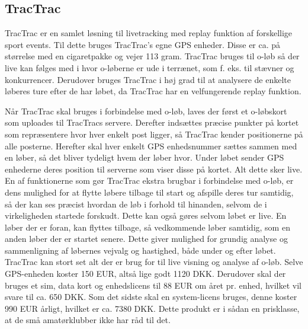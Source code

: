 \subsection{TracTrac}
TracTrac er en samlet løsning til livetracking med replay funktion af forskellige sport events. Til dette bruges TracTrac's egne GPS enheder. Disse er ca. på størrelse med en cigaretpakke og vejer 113 gram.\newline
TracTrac bruges til o-løb så der live kan følges med i hvor o-løberne er ude i terrænet, som f. eks. til stævner og konkurrencer. Derudover bruges TracTrac i høj grad til at analysere de enkelte løberes ture efter de har løbet, da TracTrac har en velfungerende replay funktion. 

Når TracTrac skal bruges i forbindelse med o-løb, laves der først et o-løbskort som uploades til TracTracs servere. Derefter indsættes præcise punkter på kortet som repræsentere hvor hver enkelt post ligger, så TracTrac kender positionerne på alle posterne. Herefter skal hver enkelt GPS enhedsnummer sættes sammen med en løber, så det bliver tydeligt hvem der løber hvor. Under løbet sender GPS enhederne deres position til serverne som viser disse på kortet. Alt dette sker live. En af funktionerne som gør TracTrac ekstra brugbar i forbindelse med o-løb, er dens mulighed for at flytte løbere tilbage til start og afspille deres tur samtidig, så der kan ses præcist hvordan de løb i forhold til hinanden, selvom de i virkeligheden startede forskudt. Dette kan også gøres selvom løbet er live. En løber der er foran, kan flyttes tilbage, så vedkommende løber samtidig, som en anden løber der er startet senere. Dette giver mulighed for grundig analyse og sammenligning af løbernes vejvalg og hastighed, både under og efter løbet.\newline
TracTrac kan stort set alt der er brug for til live visning og analyse af o-løb. Selve GPS-enheden koster 150 EUR, altså lige godt 1120 DKK. Derudover skal der bruges et sim, data kort og enhedslicens til 88 EUR om året pr. enhed, hvilket vil svare til ca. 650 DKK. Som det sidste skal en system-licens bruges, denne koster 990 EUR årligt, hvilket er ca. 7380 DKK. Dette produkt er i sådan en prisklasse, at de små amatørklubber ikke har råd til det. \citep{TTC}


